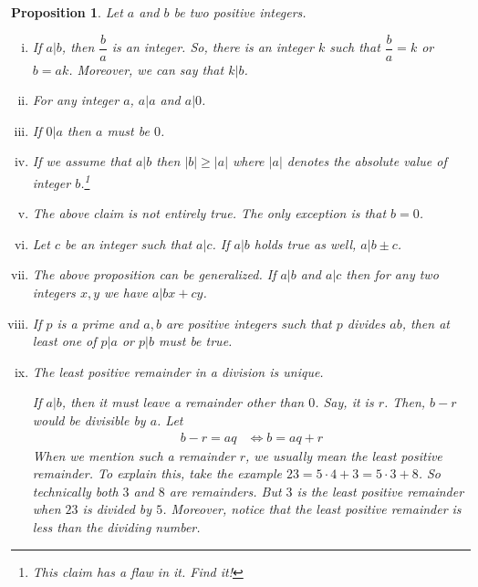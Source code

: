 \documentclass[a4paper, leqno]{article}
\newtheorem{proposition}{Proposition}
\theoremstyle{definition}
\theoremstyle{remark}
\begin{document}
		\begin{proposition}
			Let $a$ and $b$ be two positive integers.
				\begin{enumerate}[i.]
					\item If $a|b$, then $\dfrac{b}{a}$ is an integer. So, there is an integer $k$ such that $\dfrac{b}{a}=k$ or $b=ak$. Moreover, we can say that $k|b$.
					\item For any integer $a$, $a|a$ and $a|0$.
					\item If $0|a$ then $a$ must be $0$.
					\item If we assume that $a|b$ then $|b|\geq |a|$ where $|a|$ denotes the absolute value of integer $b$.\footnote{This claim has a flaw in it. Find it!}
					\item The above claim is not entirely true. The only exception is that $b=0$.
					\item Let $c$ be an integer such that $a|c$. If $a|b$ holds true as well, $a|b\pm c$.
					\item The above proposition can be generalized. If $a|b$ and $a|c$ then for any two integers $x,y$ we have $a|bx+cy$.
					\item[Euclid's Lemma] If $p$ is a prime and $a,b$ are positive integers such that $p$ divides $ab$, then at least one of $p|a$ or $p|b$ must be true.
					\item The least positive remainder in a division is unique.
					
					If $a|b$, then it must leave a remainder other than $0$. Say, it is $r$. Then, $b-r$ would be divisible by $a$. Let
						\begin{align*}
							b-r=aq & \iff b=aq+r
						\end{align*}
					When we mention such a remainder $r$, we usually mean the least positive remainder. To explain this, take the example $23=5\cdot4+3=5\cdot3+8$. So technically both $3$ and $8$ are remainders. But $3$ is the least positive remainder when $23$ is divided by $5$. Moreover, notice that the least positive remainder is less than the dividing number.
					

\end{enumerate}
\end{proposition}
\end{document}
